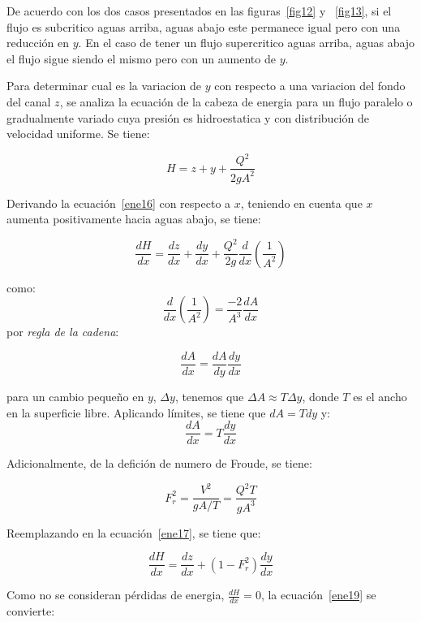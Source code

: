 \documentclass[11pt, oneside]{article}
\begin{document}
De acuerdo con los dos casos presentados en las figuras~\ref{fig12} y ~\ref{fig13}, si el flujo es subcritico aguas arriba, aguas abajo este permanece igual pero con una reducci\'on en $y$. En el caso de tener un flujo supercritico aguas arriba, aguas abajo el flujo sigue siendo el mismo pero con un aumento de $y$.

Para determinar cual es la variacion de $y$ con respecto a una variacion del fondo del canal $z$, se analiza la ecuaci\'on de la cabeza de energia para un flujo paralelo o gradualmente variado cuya presi\'on es hidroestatica y con distribuci\'on de velocidad uniforme. Se tiene:

\begin{equation}
H = z + y + \frac{Q^2}{2g A^2}
\label{ene16}
\end{equation}

Derivando la ecuaci\'on~\ref{ene16} con respecto a $x$, teniendo en cuenta que $x$ aumenta positivamente hacia aguas abajo, se tiene:

\begin{equation}
\frac{dH}{dx} = \frac{dz}{dx} + \frac{dy}{dx} + \frac{Q^2}{2g}\frac{d}{dx}\left( \frac{1}{A^2} \right)
\label{ene17}
\end{equation}

como:
$$
\frac{d}{dx}\left( \frac{1}{A^2} \right) = \frac{-2}{A^3}\frac{dA}{dx}
$$
por \emph{regla de la cadena}:

$$
\frac{dA}{dx} = \frac{dA}{dy}\frac{dy}{dx}
$$

para un cambio pequeño en $y$, $\Delta y$, tenemos que $\Delta A \approx T \Delta y$, donde $T$ es el ancho en la superficie libre. Aplicando l\'imites, se tiene que $dA = Tdy$ y:
$$
\frac{dA}{dx} = T \frac{dy}{dx}
$$

Adicionalmente, de la defici\'on de numero de Froude, se tiene:

\begin{equation}
F_r^2 = \frac{V^2}{g A/T} = \frac{Q^2 T}{g A^3}
\label{ene18}
\end{equation}

Reemplazando en la ecuaci\'on~\ref{ene17}, se tiene que:

\begin{equation}
\frac{dH}{dx} = \frac{dz}{dx} + \left( 1- F_r^2 \right)\frac{dy}{dx}
\label{ene19}
\end{equation}

Como no se consideran p\'erdidas de energia, $\frac{dH}{dx} = 0$, la ecuaci\'on~\ref{ene19} se convierte:
\end{document}

